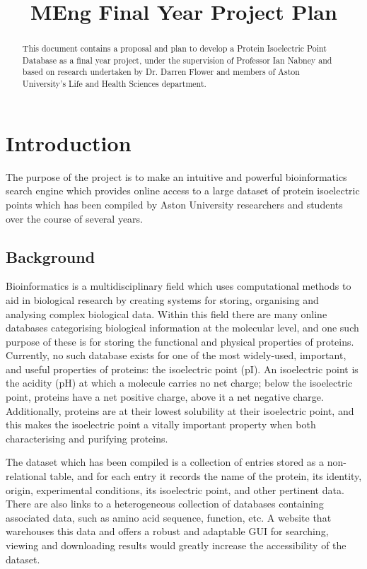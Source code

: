 \documentclass[12pt,a4paper]{article}
\title{MEng Final Year Project Plan}
\begin{document}
\maketitle

\begin{abstract}
This document contains a proposal and plan to develop a Protein Isoelectric
Point Database as a final year project, under the supervision of Professor Ian
Nabney and based on research undertaken by Dr. Darren Flower and members of
Aston University's Life and Health Sciences department.
\end{abstract}
\newpage

\tableofcontents
\listoffigures
\listoftables
\newpage
{}

\section{Introduction}

The purpose of the project is to make an intuitive and powerful bioinformatics
search engine which provides online access to a large dataset of protein
isoelectric points which has been compiled by Aston University researchers and
students over the course of several years.

\subsection{Background}
Bioinformatics is a multidisciplinary field which uses computational methods to
aid in biological research by creating systems for storing, organising and
analysing complex biological data. Within this field there are many online
databases categorising biological information at the molecular level, and one
such purpose of these is for storing the functional and physical properties of
proteins. Currently, no such database exists for one of the most widely-used,
important, and useful properties of proteins: the isoelectric point (pI). An
isoelectric point is the acidity (pH) at which a molecule carries no net charge;
below the isoelectric point, proteins have a net positive charge, above it a net
negative charge. Additionally, proteins are at their lowest solubility at their
isoelectric point, and this makes the isoelectric point a vitally important
property when both characterising and purifying proteins.

The dataset which has been compiled is a collection of entries stored as a
non-relational table, and for each entry it records the name of the protein, its
identity, origin, experimental conditions, its isoelectric point, and other
pertinent data. There are also links to a heterogeneous collection of databases
containing associated data, such as amino acid sequence, function, etc. A
website that warehouses this data and offers a robust and adaptable GUI for
searching, viewing and downloading results would greatly increase the
accessibility of the dataset.
\end{document}

